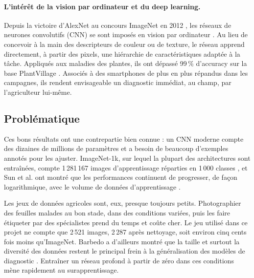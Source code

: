 \paragraph{L'intérêt de la vision par ordinateur et du deep learning.} Depuis la victoire d'AlexNet au concours ImageNet en 2012 \cite{krizhevsky2012imagenet}, les réseaux de neurones convolutifs (CNN) se sont imposés en vision par ordinateur \cite{lecun2015deep}. Au lieu de concevoir à la main des descripteurs de couleur ou de texture, le réseau apprend directement, à partir des pixels, une hiérarchie de caractéristiques adaptée à la tâche. Appliqués aux maladies des plantes, ils ont dépassé 99\,\% d'accuracy sur la base PlantVillage \cite{mohanty2016using, ferentinos2018deep}. Associés à des smartphones de plus en plus répandus dans les campagnes, ils rendent envisageable un diagnostic immédiat, au champ, par l'agriculteur lui-même.

\subsection{Problématique}

Ces bons résultats ont une contrepartie bien connue : un CNN moderne compte des dizaines de millions de paramètres et a besoin de beaucoup d'exemples annotés pour les ajuster. ImageNet-1k, sur lequel la plupart des architectures sont entraînées, compte 1\,281\,167 images d'apprentissage réparties en 1\,000 classes \cite{russakovsky2015imagenet}, et Sun et al. ont montré que les performances continuent de progresser, de façon logarithmique, avec le volume de données d'apprentissage \cite{sun2017revisiting}.

Les jeux de données agricoles sont, eux, presque toujours petits. Photographier des feuilles malades au bon stade, dans des conditions variées, puis les faire étiqueter par des spécialistes prend du temps et coûte cher. Le jeu utilisé dans ce projet ne compte que 2\,521 images, 2\,287 après nettoyage, soit environ cinq cents fois moins qu'ImageNet. Barbedo a d'ailleurs montré que la taille et surtout la diversité des données restent le principal frein à la généralisation des modèles de diagnostic \cite{barbedo2018impact}. Entraîner un réseau profond à partir de zéro dans ces conditions mène rapidement au surapprentissage.

